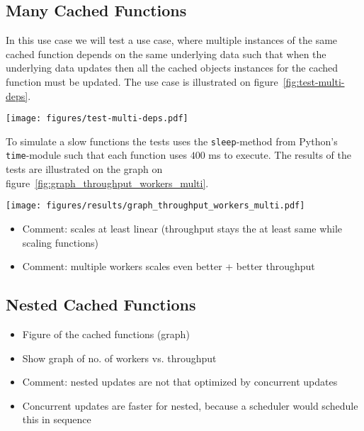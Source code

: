 \subsection{Many Cached Functions}
\label{subsec:many-cached-functions}

In this use case we will test a use case, where multiple instances of the same cached function depends on the same underlying data such that when the underlying data updates then all the cached objects instances for the cached function must be updated. The use case is illustrated on figure~\ref{fig:test-multi-deps}.

\begin{figure*}[ht!]
  \centering
  \texttt{[image: figures/test-multi-deps.pdf]}
  \caption{Illustration of the dependencies of the cached function for the "Many Cached Functions" test case}
  \label{fig:test-multi-deps}
\end{figure*}

To simulate a slow functions the tests uses the \verb$sleep$-method from Python's \verb$time$-module such that each function uses $400$ ms to execute. The results of the tests are illustrated on the graph on figure~\ref{fig:graph_throughput_workers_multi}.

\begin{figure*}[ht!]
  \centering
  \texttt{[image: figures/results/graph\_throughput\_workers\_multi.pdf]}
  \caption{How the system scales with many cached functions depending on the same underlying data while the number of workers is increased}
  \label{fig:graph_throughput_workers_multi}
\end{figure*}

\begin{itemize}
  \item Comment: scales at least linear (throughput stays the at least same while scaling functions)
  \item Comment: multiple workers scales even better + better throughput
\end{itemize}


\subsection{Nested Cached Functions}
\label{subsec:nested-cached-functions}

\begin{itemize}
  \item Figure of the cached functions (graph)
  \item Show graph of no. of workers vs. throughput
  \item Comment: nested updates are not that optimized by concurrent updates
  \item Concurrent updates are faster for nested, because a scheduler would schedule this in sequence
\end{itemize}

